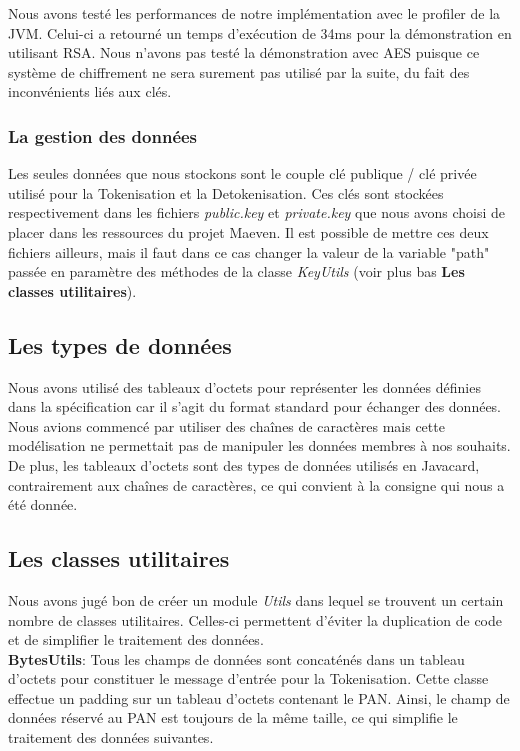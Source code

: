 \documentclass{report}
\begin{document}
\noindent
Nous avons testé les performances de notre implémentation avec le profiler de la JVM. Celui-ci a retourné un temps d'exécution de 34ms pour la démonstration en utilisant RSA. Nous n'avons pas testé la démonstration avec AES puisque ce système de chiffrement ne sera surement pas utilisé par la suite, du fait des inconvénients liés aux clés.

\subsubsection{La gestion des données}
Les seules données que nous stockons sont le couple clé publique / clé privée utilisé pour la Tokenisation et la Detokenisation. Ces clés sont stockées respectivement dans les fichiers \textit{public.key} et \textit{private.key} que nous avons choisi de placer dans les ressources du projet Maeven. Il est possible de mettre ces deux fichiers ailleurs, mais il faut dans ce cas changer la valeur de la variable "path" passée en paramètre des méthodes de la classe \textit{KeyUtils} (voir plus bas \textbf{Les classes utilitaires}).


\subsection{Les types de données}
Nous avons utilisé des tableaux d'octets pour représenter les données définies dans la spécification car il s'agit du format standard pour échanger des données. Nous avions commencé par utiliser des chaînes de caractères mais cette modélisation ne permettait pas de manipuler les données membres à nos souhaits.\\
De plus, les tableaux d'octets sont des types de données utilisés en Javacard, contrairement aux chaînes de caractères, ce qui convient à la consigne qui nous a été donnée.

\subsection{Les classes utilitaires}
Nous avons jugé bon de créer un module \textit{Utils} dans lequel se trouvent un certain nombre de classes utilitaires. Celles-ci permettent d'éviter la duplication de code et de simplifier le traitement des données.\\

\noindent
\textbf{BytesUtils}: Tous les champs de données sont concaténés dans un tableau d'octets pour constituer le message d'entrée pour la Tokenisation. Cette classe effectue un padding sur un tableau d'octets contenant le PAN. Ainsi, le champ de données réservé au PAN est toujours de la même taille, ce qui simplifie le traitement des données suivantes.\\
\end{document}
